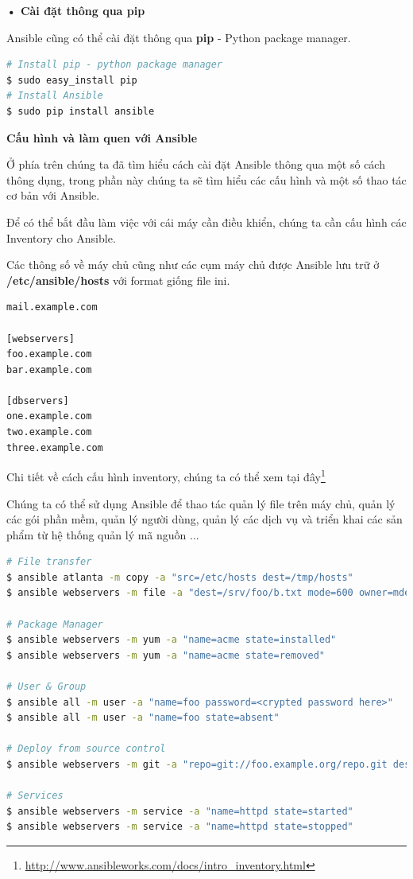 \textbf{• Cài đặt thông qua pip}

Ansible cũng có thể cài đặt thông qua \textbf{pip} - Python package manager.

\begin{lstlisting}[label={lst:ansible_install_pip},caption={Cài đặt Ansible thông qua pip}, language=bash, deletekeywords={}]
# Install pip - python package manager
$ sudo easy_install pip
# Install Ansible
$ sudo pip install ansible
\end{lstlisting}

\textbf{\large Cấu hình và làm quen với Ansible}

Ở phía trên chúng ta đã tìm hiểu cách cài đặt Ansible thông qua một số cách thông dụng, trong phần này chúng ta sẽ tìm hiểu các cấu hình và một số thao tác cơ bản với Ansible.

Để có thể bắt đầu làm việc với cái máy cần điều khiển, chúng ta cần cấu hình các Inventory cho Ansible.

Các thông số về máy chủ cũng như các cụm máy chủ được Ansible lưu trữ ở \textbf{/etc/ansible/hosts} với format giống file ini.

\begin{lstlisting}[label={lst:ansible_config_inventory},caption={Cấu hình Inventory của Ansible}]
mail.example.com

[webservers]
foo.example.com
bar.example.com

[dbservers]
one.example.com
two.example.com
three.example.com
\end{lstlisting}

Chi tiết về cách cấu hình inventory, chúng ta có thể xem tại đây\footnote{\url{http://www.ansibleworks.com/docs/intro_inventory.html}}

Chúng ta có thể sử dụng Ansible để thao tác quản lý file trên máy chủ, quản lý các gói phần mềm, quản lý người dùng, quản lý các dịch vụ và triển khai các sản phẩm từ hệ thống quản lý mã nguồn ...

\begin{lstlisting}[label={lst:ansible_adhoc_command},caption={Ansible thực hiện các chức năng thông qua dòng lệnh}, language=bash, deletekeywords={}]
# File transfer
$ ansible atlanta -m copy -a "src=/etc/hosts dest=/tmp/hosts"
$ ansible webservers -m file -a "dest=/srv/foo/b.txt mode=600 owner=mdehaan group=mdehaan"

# Package Manager
$ ansible webservers -m yum -a "name=acme state=installed"
$ ansible webservers -m yum -a "name=acme state=removed"

# User & Group
$ ansible all -m user -a "name=foo password=<crypted password here>"
$ ansible all -m user -a "name=foo state=absent"

# Deploy from source control
$ ansible webservers -m git -a "repo=git://foo.example.org/repo.git dest=/srv/myapp version=HEAD"

# Services
$ ansible webservers -m service -a "name=httpd state=started"
$ ansible webservers -m service -a "name=httpd state=stopped"

\end{lstlisting}

